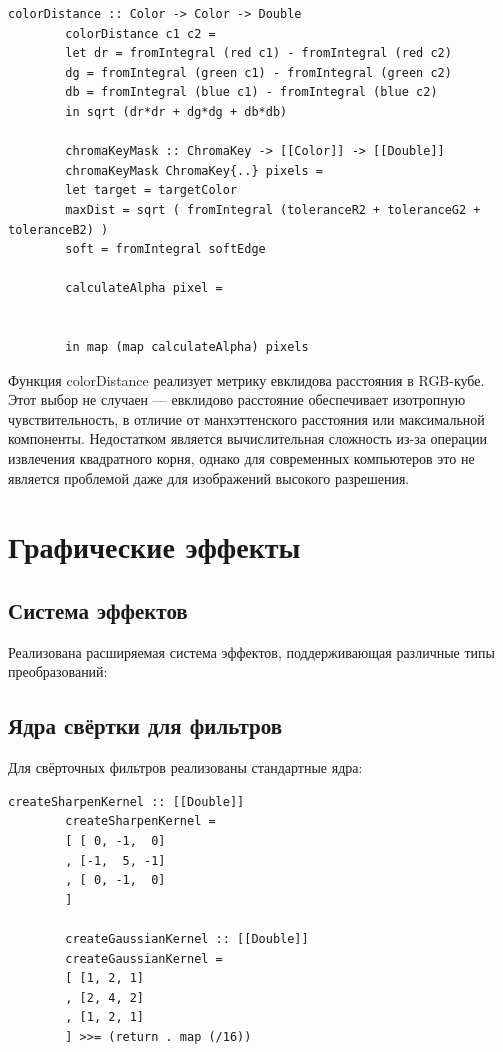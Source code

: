 \documentclass[a4paper,12pt]{article}
\begin{document}
	\begin{lstlisting}[caption=Алгоритм создания маски хромакея, label=lst:chroma-algorithm]
		colorDistance :: Color -> Color -> Double
		colorDistance c1 c2 =
		let dr = fromIntegral (red c1) - fromIntegral (red c2)
		dg = fromIntegral (green c1) - fromIntegral (green c2)
		db = fromIntegral (blue c1) - fromIntegral (blue c2)
		in sqrt (dr*dr + dg*dg + db*db)
		
		chromaKeyMask :: ChromaKey -> [[Color]] -> [[Double]]
		chromaKeyMask ChromaKey{..} pixels =
		let target = targetColor
		maxDist = sqrt ( fromIntegral (toleranceR2 + toleranceG2 + toleranceB2) )
		soft = fromIntegral softEdge
		
		calculateAlpha pixel =

		
		in map (map calculateAlpha) pixels
	\end{lstlisting}
	
	Функция colorDistance реализует метрику евклидова расстояния в RGB-кубе. Этот выбор не случаен — евклидово расстояние обеспечивает изотропную чувствительность, в отличие от манхэттенского расстояния или максимальной компоненты. Недостатком является вычислительная сложность из-за операции извлечения квадратного корня, однако для современных компьютеров это не является проблемой даже для изображений высокого разрешения.
	
	
	\newpage
	\section{Графические эффекты}
	
	\subsection{Система эффектов}
	
	Реализована расширяемая система эффектов, поддерживающая различные типы преобразований:

	\subsection{Ядра свёртки для фильтров}
	
	Для свёрточных фильтров реализованы стандартные ядра:
	
	\begin{lstlisting}[caption=Стандартные ядра свёртки, label=lst:convolution-kernels]
		createSharpenKernel :: [[Double]]
		createSharpenKernel =
		[ [ 0, -1,  0]
		, [-1,  5, -1]
		, [ 0, -1,  0]
		]
		
		createGaussianKernel :: [[Double]]
		createGaussianKernel =
		[ [1, 2, 1]
		, [2, 4, 2]
		, [1, 2, 1]
		] >>= (return . map (/16))
	\end{lstlisting}
	
\end{document}
